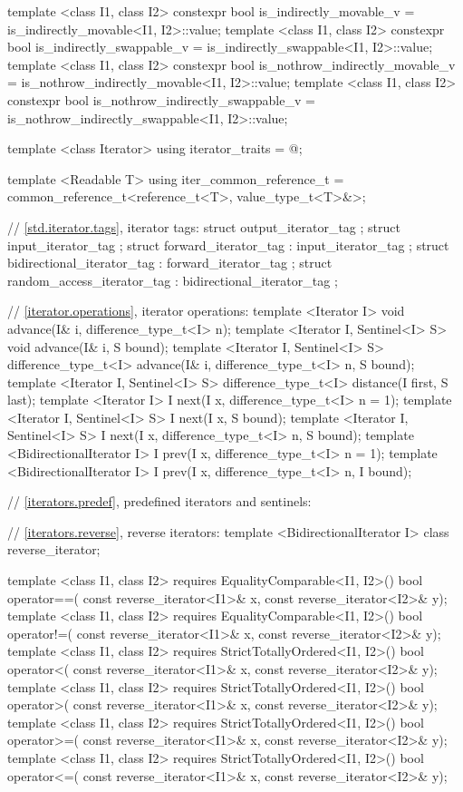 \begin{codeblock}
{{{{  template <class I1, class I2> constexpr bool is_indirectly_movable_v
    = is_indirectly_movable<I1, I2>::value;
  template <class I1, class I2> constexpr bool is_indirectly_swappable_v
    = is_indirectly_swappable<I1, I2>::value;
  template <class I1, class I2> constexpr bool is_nothrow_indirectly_movable_v
    = is_nothrow_indirectly_movable<I1, I2>::value;
  template <class I1, class I2> constexpr bool is_nothrow_indirectly_swappable_v
    = is_nothrow_indirectly_swappable<I1, I2>::value;

  template <class Iterator> using iterator_traits = @\seebelow@;

  template <Readable T> using iter_common_reference_t
    = common_reference_t<reference_t<T>, value_type_t<T>&>;

  // \ref{std.iterator.tags}, iterator tags:
  struct output_iterator_tag { };
  struct input_iterator_tag { };
  struct forward_iterator_tag : input_iterator_tag { };
  struct bidirectional_iterator_tag : forward_iterator_tag { };
  struct random_access_iterator_tag : bidirectional_iterator_tag { };

  // \ref{iterator.operations}, iterator operations:
  template <Iterator I>
    void advance(I& i, difference_type_t<I> n);
  template <Iterator I, Sentinel<I> S>
    void advance(I& i, S bound);
  template <Iterator I, Sentinel<I> S>
    difference_type_t<I> advance(I& i, difference_type_t<I> n, S bound);
  template <Iterator I, Sentinel<I> S>
    difference_type_t<I> distance(I first, S last);
  template <Iterator I>
    I next(I x, difference_type_t<I> n = 1);
  template <Iterator I, Sentinel<I> S>
    I next(I x, S bound);
  template <Iterator I, Sentinel<I> S>
    I next(I x, difference_type_t<I> n, S bound);
  template <BidirectionalIterator I>
    I prev(I x, difference_type_t<I> n = 1);
  template <BidirectionalIterator I>
    I prev(I x, difference_type_t<I> n, I bound);

  // \ref{iterators.predef}, predefined iterators and sentinels:

  // \ref{iterators.reverse}, reverse iterators:
  template <BidirectionalIterator I> class reverse_iterator;

  template <class I1, class I2>
      requires EqualityComparable<I1, I2>()
    bool operator==(
      const reverse_iterator<I1>& x,
      const reverse_iterator<I2>& y);
  template <class I1, class I2>
      requires EqualityComparable<I1, I2>()
    bool operator!=(
      const reverse_iterator<I1>& x,
      const reverse_iterator<I2>& y);
  template <class I1, class I2>
      requires StrictTotallyOrdered<I1, I2>()
    bool operator<(
      const reverse_iterator<I1>& x,
      const reverse_iterator<I2>& y);
  template <class I1, class I2>
      requires StrictTotallyOrdered<I1, I2>()
    bool operator>(
      const reverse_iterator<I1>& x,
      const reverse_iterator<I2>& y);
  template <class I1, class I2>
      requires StrictTotallyOrdered<I1, I2>()
    bool operator>=(
      const reverse_iterator<I1>& x,
      const reverse_iterator<I2>& y);
  template <class I1, class I2>
      requires StrictTotallyOrdered<I1, I2>()
    bool operator<=(
      const reverse_iterator<I1>& x,
      const reverse_iterator<I2>& y);

}}}}
\end{codeblock}
